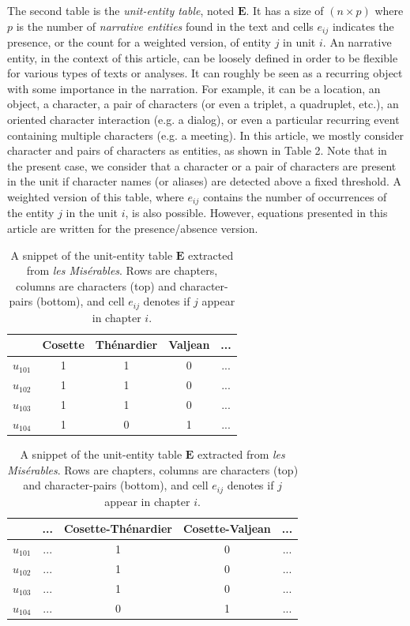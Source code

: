 \documentclass[
twocolumn,
]{ceurart}
\begin{document}
The second table is the \emph{unit-entity table}, noted $\mathbf{E}$. It has a size of $(n \times p)$ where $p$ is the number of \emph{narrative entities} found in the text and cells $e_{ij}$ indicates the presence, or the count for a weighted version, of entity $j$ in unit $i$. An narrative entity, in the context of this article, can be loosely defined in order to be flexible for various types of texts or analyses. It can roughly be seen as a recurring object with some importance in the narration. For example, it can be a location, an object, a character, a pair of characters (or even a triplet, a quadruplet, etc.), an oriented character interaction (e.g. a dialog), or even a particular recurring event containing multiple characters (e.g. a meeting). In this article, we mostly consider character and pairs of characters as entities, as shown in Table 2. Note that in the present case, we consider that a character or a pair of characters are present in the unit if character names (or aliases) are detected above a fixed threshold. A weighted version of this table, where $e_{ij}$ contains the number of occurrences of the entity $j$ in the unit $i$, is also possible. However, equations presented in this article are written for the presence/absence version.

\begin{table}[h]
	\scriptsize
	\begin{tabular}{|c||c|c|c|c|}
		\hline
		& Cosette & Thénardier & Valjean & ... \\
		\hline
		\hline 
		$u_{101}$ & 1 & 1 & 0 & ... \\
		\hline
		$u_{102}$ & 1 & 1 & 0 & ... \\
		\hline
		$u_{103}$ & 1 & 1 & 0 & ... \\
		\hline
		$u_{104}$ & 1 & 0 & 1 & ... \\
		\hline
	\end{tabular}
	\begin{tabular}{|c||c|c|c|c|}
		\hline
		& ... & Cosette-Thénardier & Cosette-Valjean & ... \\
		\hline
		\hline 
		$u_{101}$  	& ... & 1 & 0 &  ... \\
		\hline
		$u_{102}$ 	& ... & 1 & 0 & ... \\
		\hline
		$u_{103}$  	& ... & 1 & 0 & ... \\
		\hline
		$u_{104}$ 	& ... & 0 & 1 & ... \\
		\hline
	\end{tabular}
	\label{occ_table}
	\caption{A snippet of the unit-entity table $\mathbf{E}$ extracted from \emph{les Misérables}. Rows are chapters, columns are characters (top) and character-pairs (bottom), and cell $e_{ij}$ denotes if $j$ appear in chapter $i$.}
\end{table}
\end{document}
